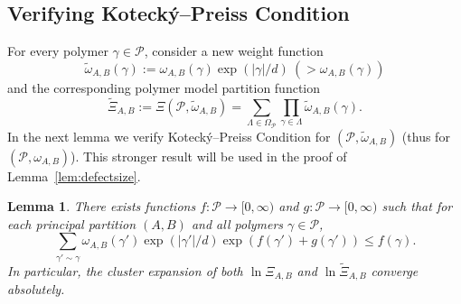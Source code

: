 \documentclass{amsart}
\newtheorem{lem}[thm]{Lemma}
\theoremstyle{definition}
\newcommand{\we}{\omega}
\newcommand{\cP}{\mathcal{P} }
\newcommand{\0}[0]{\emptyset}
\begin{document}
\subsection{Verifying Koteck\'{y}--Preiss Condition}

For every polymer $\gamma\in\cP$, consider a new weight function
\[
\tilde{\we}_{A,B}(\gamma):=\we_{A,B}(\gamma)\exp(|\gamma|/d)~(>\we_{A,B}(\gamma))
\]
and the corresponding polymer model partition function
\begin{equation}\label{def:genepmodel}
\tilde{\Xi}_{A,B}:=\Xi(\cP, \tilde{\we}_{A, B})=\sum_{\Lambda\in\Omega_{\cP}}\prod_{\gamma\in\Lambda}\tilde{\we}_{A, B}(\gamma).
\end{equation}
In the next lemma we verify Koteck\'{y}--Preiss Condition for $(\cP, \tilde \we_{A, B})$ (thus for $(\cP, {\we}_{A,B})$). This stronger result will be used in the proof of Lemma~\ref{lem:defectsize}.
\begin{lem}\label{lem:KP}
There exists functions $f: \cP \rightarrow [0, \infty)$ and $g: \cP \rightarrow [0, \infty)$ such that for each principal partition $(A, B)$ and all polymers $\gamma\in\cP$,
\begin{equation}\label{eq:kot-thm}
\sum_{\gamma'\sim \gamma}\we_{A, B}(\gamma')\exp(|\gamma'|/d)\exp\left(f(\gamma')+g(\gamma')\right)\leq f(\gamma).
\end{equation}
In particular, the cluster expansion of both $\ln\Xi_{A, B}$ and $\ln\tilde{\Xi}_{A, B}$ converge absolutely.
\end{lem}
\end{document}
